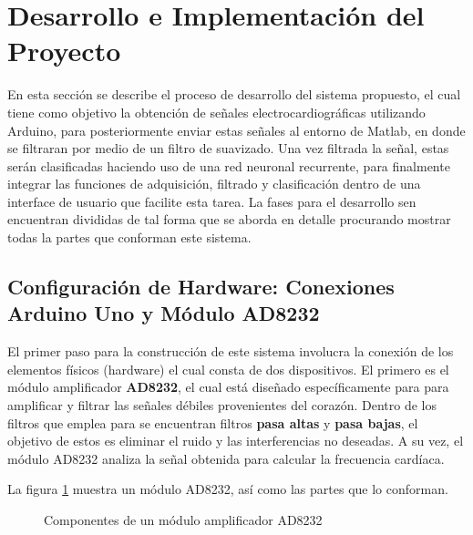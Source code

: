 \section{Desarrollo e Implementación del Proyecto}

En esta sección se describe el proceso de desarrollo del sistema propuesto, el cual tiene como objetivo la obtención de señales electrocardiográficas utilizando Arduino, para posteriormente enviar estas señales al entorno de Matlab, en donde se filtraran por medio de un filtro de suavizado. Una vez filtrada la señal, estas serán clasificadas haciendo uso de una red neuronal recurrente, para finalmente integrar las funciones de adquisición, filtrado y clasificación dentro de una interface de usuario que facilite esta tarea.
La fases para el desarrollo sen encuentran divididas de tal forma que se aborda en detalle procurando mostrar todas la partes que conforman este sistema.

\subsection[]{Configuración de Hardware: Conexiones Arduino Uno y Módulo AD8232}
El primer paso para la construcción de este sistema involucra la conexión de los elementos físicos (hardware) el cual consta de dos dispositivos. El primero es el módulo amplificador \textbf{AD8232}, el cual está diseñado específicamente para para amplificar y filtrar las señales débiles provenientes del corazón. Dentro de los filtros que emplea para se encuentran filtros \textbf{pasa altas} y \textbf{pasa bajas}, el objetivo de estos es eliminar el ruido y las interferencias no deseadas. A su vez, el módulo AD8232 analiza la señal obtenida para calcular la frecuencia cardíaca.

La figura \ref{fig:AD8232} muestra un módulo AD8232, así como las partes que lo conforman.

\begin{figure}[h!]
    \centering
    \hspace{0.01\linewidth}
    \hspace{0.01\linewidth}
    \hspace{0.01\linewidth}
    \hspace{0.01\linewidth}
    \hspace{0.01\linewidth}
    \caption{Componentes de un módulo amplificador AD8232}
    \label{fig:AD8232}
\end{figure}

